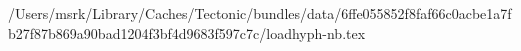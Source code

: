 /Users/msrk/Library/Caches/Tectonic/bundles/data/6ffe055852f8faf66c0acbe1a7fb27f87b869a90bad1204f3bf4d9683f597c7c/loadhyph-nb.tex